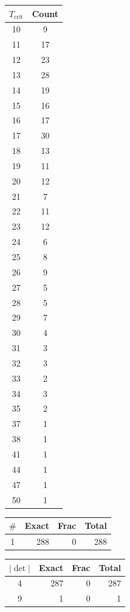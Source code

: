 \documentclass[10pt]{article}
\begin{document}
\begin{center}
\qquad\qquad
\begin{tabular}{c|c}
\toprule
$T_{\text{crit}}$ & Count \\
\midrule
10 & 9 \\
11 & 17 \\
12 & 23 \\
13 & 28 \\
14 & 19 \\
15 & 16 \\
16 & 17 \\
17 & 30 \\
18 & 13 \\
19 & 11 \\
20 & 12 \\
21 & 7 \\
22 & 11 \\
23 & 12 \\
24 & 6 \\
25 & 8 \\
26 & 9 \\
27 & 5 \\
28 & 5 \\
29 & 7 \\
30 & 4 \\
31 & 3 \\
32 & 3 \\
33 & 2 \\
34 & 3 \\
35 & 2 \\
37 & 1 \\
38 & 1 \\
41 & 1 \\
44 & 1 \\
47 & 1 \\
50 & 1 \\
\bottomrule
\end{tabular}
\end{center}

\begin{center}
\begin{tabular}{c|r r r}
\toprule
$\#$ & Exact & Frac & Total \\
\midrule
1 & 288 & 0 & 288 \\
\bottomrule
\end{tabular}
\qquad\qquad
\begin{tabular}{c|r r r}
\toprule
$|\det|$ & Exact & Frac & Total \\
\midrule
4 & 287 & 0 & 287 \\
9 & 1 & 0 & 1 \\
\bottomrule
\end{tabular}
\end{center}
\end{document}
